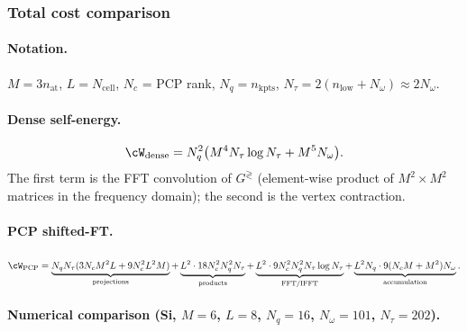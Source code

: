 \subsubsection{Total cost comparison}
\label{sssub:costs}

\paragraph{Notation.}
$M = 3 n_\mathrm{at}$, $L = N_\mathrm{cell}$,
$N_c$ = PCP rank, $N_q = n_\mathrm{kpts}$,
$N_\tau = 2(n_\mathrm{low} + N_\omega) \approx 2 N_\omega$.

\paragraph{Dense self-energy.}
\begin{equation}
  \cW_\mathrm{dense}
  = N_q^2 \bigl(M^4 N_\tau \log N_\tau + M^5 N_\omega\bigr).
\end{equation}
The first term is the FFT convolution of $G^{\gtrless}$ (element-wise
product of $M^2 \times M^2$ matrices in the frequency domain);
the second is the vertex contraction.

\paragraph{PCP shifted-FT.}
\begin{equation}\label{eq:cost_pcp_shifted}
  \cW_\mathrm{PCP}
  = \underbrace{N_q N_\tau (3 N_c M^2 L + 9 N_c^2 L^2 M)}_{\text{projections}}
  + \underbrace{L^2 \cdot 18 N_c^2 N_q^2 N_\tau}_{\text{products}}
  + \underbrace{L^2 \cdot 9 N_c^2 N_q^2 N_\tau \log N_\tau}_{\text{FFT/IFFT}}
  + \underbrace{L^2 N_q \cdot 9 (N_c M + M^2) N_\omega}_{\text{accumulation}}.
\end{equation}

\paragraph{Numerical comparison (Si, $M{=}6$, $L{=}8$, $N_q{=}16$,
$N_\omega{=}101$, $N_\tau{=}202$).}

